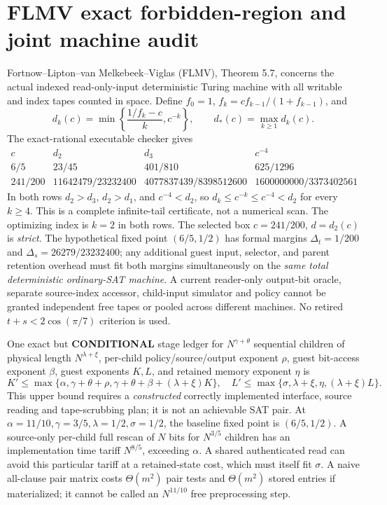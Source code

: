 \documentclass[11pt]{article}
\begin{document}
\section{FLMV exact forbidden-region and joint machine audit}
Fortnow--Lipton--van Melkebeek--Viglas (FLMV), Theorem 5.7, concerns the actual indexed read-only-input deterministic Turing machine with all writable and index tapes counted in space. Define $f_0=1$, $f_k=cf_{k-1}/(1+f_{k-1})$, and
\[
 d_k(c)=\min\left\{\frac{1/f_k-c}{k},c^{-k}\right\},
 \qquad d_*(c)=\max_{k\ge 1}d_k(c).
\]
The exact-rational executable checker gives
\[
\begin{array}{c|cc|c}
 c&d_2&d_3&c^{-4}\\\hline
 6/5&23/45&401/810&625/1296\\
 241/200&11642479/23232400&
 4077837439/8398512600&1600000000/3373402561
\end{array}
\tag{6}
\]
In both rows $d_2>d_3$, $d_2>d_1$, and $c^{-4}<d_2$, so $d_k\le c^{-k}\le c^{-4}<d_2$ for every $k\ge4$. This is a complete infinite-tail certificate, not a numerical scan. The optimizing index is $k=2$ in both rows. The selected box $c=241/200$, $d=d_2(c)$ is \emph{strict}. The hypothetical fixed point $(6/5,1/2)$ has formal margins $\Delta_t=1/200$ and $\Delta_s=26279/23232400$; any additional guest input, selector, and parent retention overhead must fit both margins simultaneously on the \emph{same total deterministic ordinary-SAT machine}. A current reader-only output-bit oracle, separate source-index accessor, child-input simulator and policy cannot be granted independent free tapes or pooled across different machines. No retired $t+s<2\cos(\pi/7)$ criterion is used.

One exact but \textbf{CONDITIONAL} stage ledger for $N^{\gamma+\theta}$ sequential children of physical length $N^{\lambda+\xi}$, per-child policy/source/output exponent $\rho$, guest bit-access exponent $\beta$, guest exponents $K,L$, and retained memory exponent $\eta$ is
\[
 K'\le\max\{\alpha,\gamma+\theta+\rho,
       \gamma+\theta+\beta+(\lambda+\xi)K\},
\quad
 L'\le\max\{\sigma,\lambda+\xi,\eta,(\lambda+\xi)L\}.
\tag{7}
\]
This upper bound requires a \emph{constructed} correctly implemented interface, source reading and tape-scrubbing plan; it is not an achievable SAT pair. At $\alpha=11/10,\gamma=3/5,\lambda=1/2,\sigma=1/2$, the baseline fixed point is $(6/5,1/2)$. A source-only per-child full rescan of $N$ bits for $N^{3/5}$ children has an implementation time tariff $N^{8/5}$, exceeding $\alpha$. A shared authenticated read can avoid this particular tariff at a retained-state cost, which must itself fit $\sigma$. A naive all-clause pair matrix costs $\Theta(m^2)$ pair tests and $\Theta(m^2)$ stored entries if materialized; it cannot be called an $N^{11/10}$ free preprocessing step.
\end{document}
